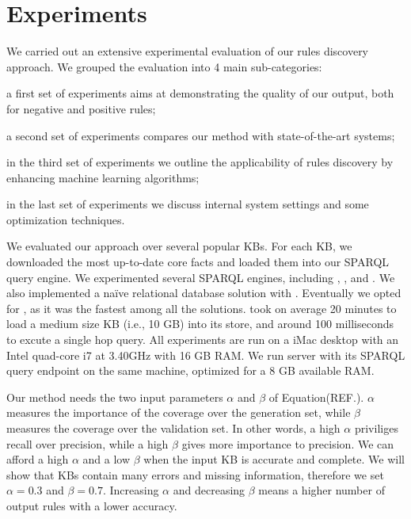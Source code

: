 \section{Experiments} \label{sec:experiment}
We carried out an extensive experimental evaluation of our rules discovery approach.
We grouped the evaluation into 4 main sub-categories: 
\begin{inparaenum}[\itshape(i)]
	\item a first set of experiments aims at demonstrating the quality of our output, both for negative and positive rules;
	\item a second set of experiments compares our method with state-of-the-art systems;
	\item in the third set of experiments we outline the applicability of rules discovery by enhancing machine learning algorithms;
	\item in the last set of experiments we discuss internal system settings and some optimization techniques.
\end{inparaenum}

We evaluated our approach over several popular KBs. For each KB, we downloaded the most up-to-date core facts and loaded them into our SPARQL query engine. We experimented several SPARQL engines, including , , and . We also implemented a na\"ive relational database solution with . Eventually we opted for , as it was the fastest among all the solutions.  took on average 20 minutes to load a medium size KB (i.e., 10 GB) into its store, and around 100 milliseconds to excute a single hop query. All experiments are run on a iMac desktop with
an Intel quad-core i7 at 3.40GHz with 16 GB RAM. We run  server with its SPARQL query endpoint on the same machine, optimized for a 8 GB available RAM.

Our method needs the two input parameters $\alpha$ and $\beta$ of Equation(REF.). $\alpha$ measures the importance of the coverage over the generation set, while $\beta$ measures the coverage over the validation set. In other words, a high $\alpha$ priviliges recall over precision, while a high $\beta$ gives more importance to precision. We can afford a high $\alpha$ and a low $\beta$ when the input KB is accurate and complete. We will show that KBs contain many errors and missing information, therefore we set $\alpha = 0.3$ and $\beta = 0.7$. Increasing $\alpha$ and decreasing $\beta$ means a higher number of output rules with a lower accuracy. 

